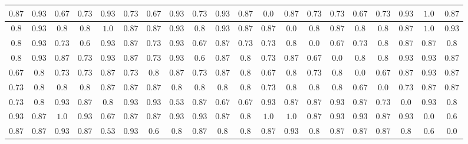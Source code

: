 \begin{table}[h!]
{\begin{tabular}{cccccccccccccccccccc}
        $0.87$ & $0.93$ & $0.67$ & $0.73$ & $0.93$ & $0.73$ & $0.67$ & $0.93$ & $0.73$ & $0.93$ & $0.87$ & $0.0$ & $0.87$ & $0.73$ & $0.73$ & $0.67$ & $0.73$ & $0.93$ & $1.0$ & $0.87$\\ \hline
        $0.8$ & $0.93$ & $0.8$ & $0.8$ & $1.0$ & $0.87$ & $0.87$ & $0.93$ & $0.8$ & $0.93$ & $0.87$ & $0.87$ & $0.0$ & $0.8$ & $0.87$ & $0.8$ & $0.8$ & $0.87$ & $1.0$ & $0.93$\\ \hline
        $0.8$ & $0.93$ & $0.73$ & $0.6$ & $0.93$ & $0.87$ & $0.73$ & $0.93$ & $0.67$ & $0.87$ & $0.73$ & $0.73$ & $0.8$ & $0.0$ & $0.67$ & $0.73$ & $0.8$ & $0.87$ & $0.87$ & $0.8$\\ \hline
        $0.8$ & $0.93$ & $0.87$ & $0.73$ & $0.93$ & $0.87$ & $0.73$ & $0.93$ & $0.6$ & $0.87$ & $0.8$ & $0.73$ & $0.87$ & $0.67$ & $0.0$ & $0.8$ & $0.8$ & $0.93$ & $0.93$ & $0.87$\\ \hline
        $0.67$ & $0.8$ & $0.73$ & $0.73$ & $0.87$ & $0.73$ & $0.8$ & $0.87$ & $0.73$ & $0.87$ & $0.8$ & $0.67$ & $0.8$ & $0.73$ & $0.8$ & $0.0$ & $0.67$ & $0.87$ & $0.93$ & $0.87$\\ \hline
        $0.73$ & $0.8$ & $0.8$ & $0.8$ & $0.87$ & $0.87$ & $0.87$ & $0.8$ & $0.8$ & $0.8$ & $0.8$ & $0.73$ & $0.8$ & $0.8$ & $0.8$ & $0.67$ & $0.0$ & $0.73$ & $0.87$ & $0.87$\\ \hline
        $0.73$ & $0.8$ & $0.93$ & $0.87$ & $0.8$ & $0.93$ & $0.93$ & $0.53$ & $0.87$ & $0.67$ & $0.67$ & $0.93$ & $0.87$ & $0.87$ & $0.93$ & $0.87$ & $0.73$ & $0.0$ & $0.93$ & $0.8$\\ \hline
        $0.93$ & $0.87$ & $1.0$ & $0.93$ & $0.67$ & $0.87$ & $0.87$ & $0.93$ & $0.93$ & $0.87$ & $0.8$ & $1.0$ & $1.0$ & $0.87$ & $0.93$ & $0.93$ & $0.87$ & $0.93$ & $0.0$ & $0.6$\\ \hline
        $0.87$ & $0.87$ & $0.93$ & $0.87$ & $0.53$ & $0.93$ & $0.6$ & $0.8$ & $0.87$ & $0.8$ & $0.8$ & $0.87$ & $0.93$ & $0.8$ & $0.87$ & $0.87$ & $0.87$ & $0.8$ & $0.6$ & $0.0$
        \end{tabular}}
\end{table}

